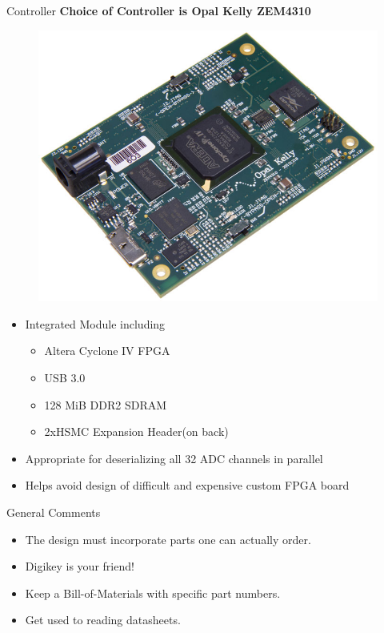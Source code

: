 \documentclass{beamer}
\begin{document}
\begin{frame}[shrink]{Controller}
  \centering
  \textbf{Choice of Controller is Opal Kelly ZEM4310}
  \begin{figure}
    \includegraphics[height=0.35\textheight]{figures/zem4310}
  \end{figure}
  \begin{itemize}
    \item Integrated Module including
      \begin{itemize}
        \item Altera Cyclone IV FPGA
        \item USB 3.0
        \item 128 MiB DDR2 SDRAM
        \item 2xHSMC Expansion Header(on back)
      \end{itemize}
    \item Appropriate for deserializing all 32 ADC channels in parallel
    \item Helps avoid design of difficult and expensive custom FPGA board
  \end{itemize}
\end{frame}


\begin{frame}{General Comments}
  \begin{itemize}
    \item The design must incorporate parts one can actually order.
    \item Digikey is your friend!
    \item Keep a Bill-of-Materials with specific part numbers.
    \item Get used to reading datasheets.
  \end{itemize}
\end{frame}
\end{document}
